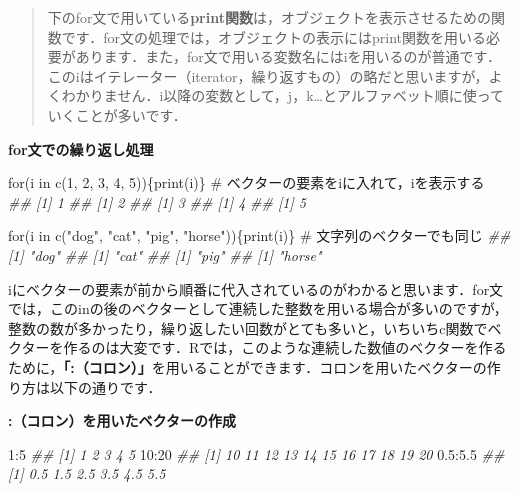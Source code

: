 \documentclass[
  letterpaper,
  DIV=11,
  numbers=noendperiod]{scrreprt}
\newenvironment{Shaded}{\begin{snugshade}}{\end{snugshade}}
\newcommand{\CommentTok}[1]{\textcolor[rgb]{0.37,0.37,0.37}{#1}}
\newcommand{\ControlFlowTok}[1]{\textcolor[rgb]{0.00,0.23,0.31}{#1}}
\newcommand{\DecValTok}[1]{\textcolor[rgb]{0.68,0.00,0.00}{#1}}
\newcommand{\DocumentationTok}[1]{\textcolor[rgb]{0.37,0.37,0.37}{\textit{#1}}}
\newcommand{\FloatTok}[1]{\textcolor[rgb]{0.68,0.00,0.00}{#1}}
\newcommand{\FunctionTok}[1]{\textcolor[rgb]{0.28,0.35,0.67}{#1}}
\newcommand{\NormalTok}[1]{\textcolor[rgb]{0.00,0.23,0.31}{#1}}
\newcommand{\SpecialCharTok}[1]{\textcolor[rgb]{0.37,0.37,0.37}{#1}}
\newcommand{\StringTok}[1]{\textcolor[rgb]{0.13,0.47,0.30}{#1}}
\begin{document}
\begin{quote}
下のfor文で用いている\textbf{print関数}は，オブジェクトを表示させるための関数です．for文の処理では，オブジェクトの表示にはprint関数を用いる必要があります．また，for文で用いる変数名にはiを用いるのが普通です．このiはイテレーター（iterator，繰り返すもの）の略だと思いますが，よくわかりません．i以降の変数として，j，k\ldots とアルファベット順に使っていくことが多いです．
\end{quote}

\textbf{for文での繰り返し処理}

\begin{Shaded}
\begin{Highlighting}[]
\ControlFlowTok{for}\NormalTok{(i }\ControlFlowTok{in} \FunctionTok{c}\NormalTok{(}\DecValTok{1}\NormalTok{, }\DecValTok{2}\NormalTok{, }\DecValTok{3}\NormalTok{, }\DecValTok{4}\NormalTok{, }\DecValTok{5}\NormalTok{))\{}\FunctionTok{print}\NormalTok{(i)\} }\CommentTok{\# ベクターの要素をiに入れて，iを表示する}
\DocumentationTok{\#\# [1] 1}
\DocumentationTok{\#\# [1] 2}
\DocumentationTok{\#\# [1] 3}
\DocumentationTok{\#\# [1] 4}
\DocumentationTok{\#\# [1] 5}

\ControlFlowTok{for}\NormalTok{(i }\ControlFlowTok{in} \FunctionTok{c}\NormalTok{(}\StringTok{"dog"}\NormalTok{, }\StringTok{"cat"}\NormalTok{, }\StringTok{"pig"}\NormalTok{, }\StringTok{"horse"}\NormalTok{))\{}\FunctionTok{print}\NormalTok{(i)\} }\CommentTok{\# 文字列のベクターでも同じ}
\DocumentationTok{\#\# [1] "dog"}
\DocumentationTok{\#\# [1] "cat"}
\DocumentationTok{\#\# [1] "pig"}
\DocumentationTok{\#\# [1] "horse"}
\end{Highlighting}
\end{Shaded}

iにベクターの要素が前から順番に代入されているのがわかると思います．for文では，このinの後のベクターとして連続した整数を用いる場合が多いのですが，整数の数が多かったり，繰り返したい回数がとても多いと，いちいちc関数でベクターを作るのは大変です．Rでは，このような連続した数値のベクターを作るために，\textbf{「:（コロン）」}を用いることができます．コロンを用いたベクターの作り方は以下の通りです．

\textbf{:（コロン）を用いたベクターの作成}

\begin{Shaded}
\begin{Highlighting}[]
\DecValTok{1}\SpecialCharTok{:}\DecValTok{5}
\DocumentationTok{\#\# [1] 1 2 3 4 5}
\DecValTok{10}\SpecialCharTok{:}\DecValTok{20}
\DocumentationTok{\#\#  [1] 10 11 12 13 14 15 16 17 18 19 20}
\FloatTok{0.5}\SpecialCharTok{:}\FloatTok{5.5}
\DocumentationTok{\#\# [1] 0.5 1.5 2.5 3.5 4.5 5.5}
\end{Highlighting}
\end{Shaded}
\end{document}
